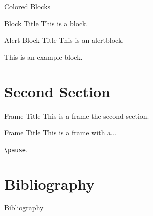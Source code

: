 \documentclass{beamer}
\begin{document}
    \begin{frame}{Colored Blocks}
        \begin{block}{Block Title}
            This is a block.
        \end{block}

        \begin{alertblock}{Alert Block Title}
            This is an alertblock.
        \end{alertblock}

        \begin{example}
            This is an example block.
        \end{example}
    \end{frame}




\section{Second Section}

    \begin{frame}{Frame Title}
        This is a frame the second section.
    \end{frame}

    \begin{frame}{Frame Title}
        This is a frame with a...

        \pause

        \texttt{\textbackslash pause}.
    \end{frame}

\section{Bibliography}

    \nocite{Ackerson&Fu}
    \nocite{Barber}
	\nocite{linderman2015dependent}


    \begin{frame}{Bibliography}
        
        
    \end{frame}
\end{document}
